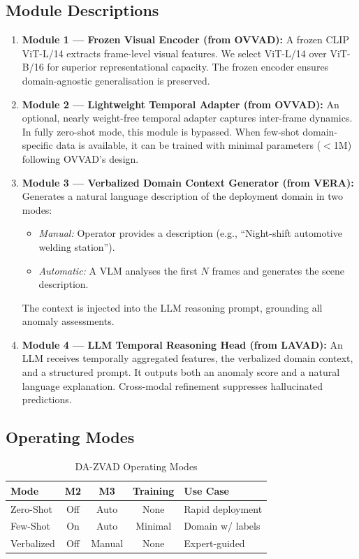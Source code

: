 \subsection{Module Descriptions}

\begin{enumerate}[leftmargin=*]
    \item \textbf{Module 1 --- Frozen Visual Encoder (from OVVAD):}
    A frozen CLIP ViT-L/14 extracts frame-level visual features. We select ViT-L/14 over ViT-B/16 for superior representational capacity. The frozen encoder ensures domain-agnostic generalisation is preserved.

    \item \textbf{Module 2 --- Lightweight Temporal Adapter (from OVVAD):}
    An optional, nearly weight-free temporal adapter captures inter-frame dynamics. In fully zero-shot mode, this module is bypassed. When few-shot domain-specific data is available, it can be trained with minimal parameters ($<$1M) following OVVAD's design.

    \item \textbf{Module 3 --- Verbalized Domain Context Generator (from VERA):}
    Generates a natural language description of the deployment domain in two modes:
    \begin{itemize}
        \item \textit{Manual:} Operator provides a description (e.g., ``Night-shift automotive welding station'').
        \item \textit{Automatic:} A VLM analyses the first $N$ frames and generates the scene description.
    \end{itemize}
    The context is injected into the LLM reasoning prompt, grounding all anomaly assessments.

    \item \textbf{Module 4 --- LLM Temporal Reasoning Head (from LAVAD):}
    An LLM receives temporally aggregated features, the verbalized domain context, and a structured prompt. It outputs both an anomaly score and a natural language explanation. Cross-modal refinement suppresses hallucinated predictions.
\end{enumerate}

\subsection{Operating Modes}

\begin{table}[h]
\centering
\caption{DA-ZVAD Operating Modes}
\label{tab:modes}
\renewcommand{\arraystretch}{1.25}
\small
\begin{tabular}{@{} l c c c l @{}}
\toprule
\textbf{Mode} & \textbf{M2} & \textbf{M3} & \textbf{Training} & \textbf{Use Case} \\
\midrule
Zero-Shot & Off & Auto & None & Rapid deployment \\
Few-Shot & On & Auto & Minimal & Domain w/ labels \\
Verbalized & Off & Manual & None & Expert-guided \\
\bottomrule
\end{tabular}
\end{table}

